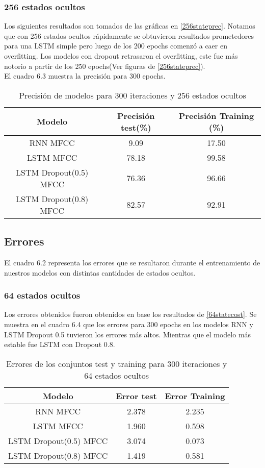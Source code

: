 \subsubsection{256 estados ocultos}
Los siguientes resultados son tomados de las gráficas en \ref{256stateprec}. Notamos que con 256 estados ocultos rápidamente se obtuvieron resultados prometedores para una LSTM simple pero luego de los 200 epochs comenzó a caer en overfitting. Los modelos con dropout retrasaron el overfitting, este fue más notorio a partir de los 250 epochs(Ver figuras de \ref{256stateprec}).\\ El cuadro 6.3 muestra la precisión para 300 epochs.
\begin{table}[H]
	\centering
	\begin{tabular}{|c|c|c|}
		\hline
		\rowcolor{Gray}  Modelo & Precisión test(\%) & Precisión Training (\%)\\ \hline
		RNN MFCC&        9.09  &             17.50      \\ \hline
		
		LSTM MFCC&        78.18  &          99.58         \\ \hline
		
		LSTM Dropout(0.5) MFCC&  76.36         &     96.66         \\ \hline
		
		LSTM Dropout(0.8) MFCC&	82.57		&	92.91		\\ \hline
		
	\end{tabular}
	\caption{Precisión de modelos para 300 iteraciones y 256 estados ocultos}
\end{table}
\subsection{Errores }
El cuadro 6.2 representa los errores que se resultaron durante el entrenamiento de nuestros modelos con distintas cantidades de estados ocultos.
\subsubsection{64 estados ocultos}
Los errores obtenidos fueron obtenidos en base los resultados de \ref{64statecost}. Se muestra en el cuadro 6.4 que los errores para 300 epochs en los modelos RNN y LSTM Dropout 0.5 tuvieron los errores más altos.	Mientras que el modelo más estable fue LSTM con Dropout 0.8. 
\begin{table}[H]
	\centering
	\begin{tabular}{|c|c|c|}
		\hline
		\rowcolor{Gray}  Modelo & Error test& Error Training \\ \hline
		RNN MFCC&        2.378  &             2.235       \\ \hline
		LSTM MFCC&        1.960 &          0.598     \\ \hline
		LSTM Dropout(0.5) MFCC&  3.074         &    0.073        \\ \hline
		LSTM Dropout(0.8) MFCC&	1.419		&	0.581	\\ \hline
	\end{tabular}
	\caption{Errores de los conjuntos test y training para 300 iteraciones y 64 estados ocultos}
\end{table}

